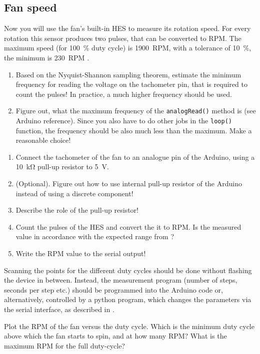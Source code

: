 \subsection{Fan speed}
Now you will use the fan's built-in \ac{HES} to measure its rotation speed. For every rotation this sensor produces two pulses, that can be converted to \ac{RPM}. The maximum speed (for \SI{100}{\percent} duty cycle) is \SI{1900}{RPM}, with a tolerance of \SI{10}{\percent}, the minimum is \SI{230}{RPM} \cite{fan}.
%
\newpage
\begin{task}
  \begin{enumerate}
    \item Based on the Nyquist-Shannon sampling theorem, estimate the minimum frequency for reading the voltage on the tachometer pin, that is required to count the pulses! In practice, a much higher frequency should be used.
    \item Figure out, what the maximum frequency of the \texttt{analogRead()} method is (see Arduino reference). Since you also have to do other jobs in the \texttt{loop()} function, the frequency should be also much less than the maximum. Make a reasonable choice!
  \end{enumerate}
\end{task}
%    
\begin{task}
  \begin{enumerate}
    \item Connect the tachometer of the fan to an analogue pin of the Arduino, using a \SI{10}{\kilo\ohm} pull-up resistor to \SI{5}{\V}. 
    \item (Optional). Figure out how to use internal pull-up resistor of the Arduino instead of using a discrete component!
    \item Describe the role of the pull-up resistor!
    \item Count the pulses of the \ac{HES} and convert the it to \ac{RPM}. Is the measured value in accordance with the expected range from \cite{fan}?
    \item Write the \ac{RPM} value to the serial output!
  \end{enumerate}
\end{task}
%
Scanning the points for the different duty cycles should be done without flashing the device in between. Instead, the measurement program (\eg number of steps, seconds per step etc.) should be programmed into the Arduino code or, alternatively, controlled by a python program, which changes the parameters via the serial interface, as described in .\par
%
\begin{task}
  Plot the \ac{RPM} of the fan versus the duty cycle. Which is the minimum duty cycle above which the fan starts to spin, and at how many \ac{RPM}? What is the maximum \ac{RPM} for the full duty-cycle?
\end{task}
%
